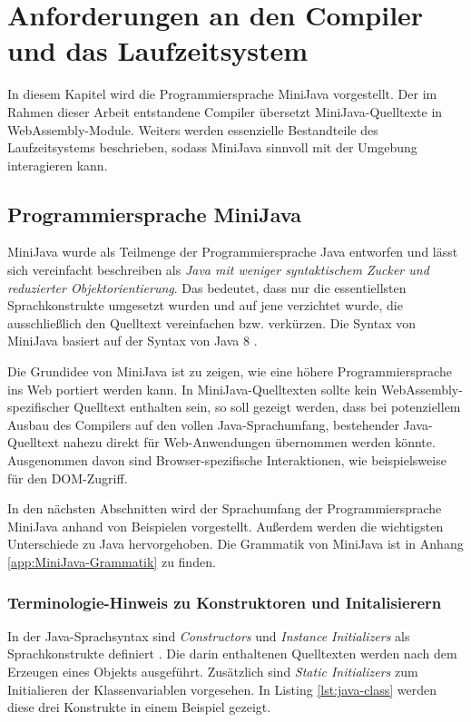\chapter{Anforderungen an den Compiler und das Laufzeitsystem}
\label{cha:MiniJava}

In diesem Kapitel wird die Programmiersprache MiniJava vorgestellt. Der im Rahmen dieser Arbeit entstandene Compiler übersetzt MiniJava-Quelltexte in WebAssembly-Module. Weiters werden essenzielle Bestandteile des Laufzeitsystems beschrieben, sodass MiniJava sinnvoll mit der Umgebung interagieren kann.

\section{Programmiersprache MiniJava}

MiniJava wurde als Teilmenge der Programmiersprache Java entworfen und lässt sich vereinfacht beschreiben als \emph{Java mit weniger syntaktischem Zucker und reduzierter Objektorientierung}. Das bedeutet, dass nur die essentiellsten Sprachkonstrukte umgesetzt wurden und auf jene verzichtet wurde, die ausschließlich den Quelltext vereinfachen bzw. verkürzen. Die Syntax von MiniJava basiert auf der Syntax von Java 8 \cite{Java8Specification}.

Die Grundidee von MiniJava ist zu zeigen, wie eine höhere Programmiersprache ins Web portiert werden kann. In MiniJava-Quelltexten sollte kein WebAssembly-spezifischer Quelltext enthalten sein, so soll gezeigt werden, dass bei potenziellem Ausbau des Compilers auf den vollen Java-Sprachumfang, bestehender Java-Quelltext nahezu direkt für Web-Anwendungen übernommen werden könnte. Ausgenommen davon sind Browser-spezifische Interaktionen, wie beispielsweise für den DOM-Zugriff.

In den nächsten Abschnitten wird der Sprachumfang der Programmiersprache MiniJava anhand von Beispielen vorgestellt. Außerdem werden die wichtigsten Unterschiede zu Java hervorgehoben. Die Grammatik von MiniJava ist in Anhang \ref{app:MiniJava-Grammatik} zu finden.

\pagebreak
\subsection{Terminologie-Hinweis zu Konstruktoren und Initalisierern}

In der Java-Sprachsyntax sind \emph{Constructors} und \emph{Instance Initializers} als Sprachkonstrukte definiert \cite{Java8Specification}. Die darin enthaltenen Quelltexten werden nach dem Erzeugen eines Objekts ausgeführt. Zusätzlich sind \emph{Static Initializers} zum Initialieren der Klassenvariablen vorgesehen. In Listing \ref{lst:java-class} werden diese drei Konstrukte in einem Beispiel gezeigt.

